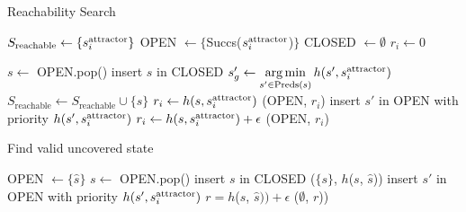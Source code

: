 \documentclass[a4paper,10pt]{article}
\begin{document}
\begin{algorithm}[t]
\caption{Reachability Search}\label{alg:2}

\begin{algorithmic}[1]
\State $S_{\text{reachable}} \leftarrow \{s^{\text{attractor}}_i\}$  \label{alg:2:reachable}
\State OPEN $\leftarrow \{$Succs($s^{\text{attractor}}_i$)$\}$   \label{alg:2:OPEN}
\State CLOSED $\leftarrow \emptyset$
\State $r_i \leftarrow 0$

    \State $s \leftarrow$ OPEN.pop()
    \State insert $s$ in CLOSED
    \State $s'_g \leftarrow \operatorname*{arg\,min}\limits_{s' \in \text{Preds}(s)} h(s', s^{\text{attractor}}_i)$ 
  \label{alg:2:greedy} 
      \label{alg:2:crit}
        \State $S_{\text{reachable}} \leftarrow S_{\text{reachable}} \cup \{s\}$   \label{alg:2:set}
     \label{alg:2:terminate}
        \State $r_i \leftarrow h(s, s^{\text{attractor}}_i)$ \label{alg:2:rad}
        \State \Return (OPEN, $r_i$)
    \EndIf
     \label{alg:2:prun}
            \State insert $s'$ in OPEN with priority $h(s', s^{\text{attractor}}_i)$
        \EndIf
    \EndFor
\EndWhile
\State $r_i \leftarrow h(s, s^{\text{attractor}}_i) + \epsilon$    
\State \Return (OPEN, $r_i$)

\EndProcedure
\end{algorithmic}
\end{algorithm}

\begin{algorithm}[t]
\caption{Find valid uncovered state}\label{alg:3b}

\begin{algorithmic}[1]
\State OPEN $\leftarrow \{\hat{s}\}$
  \State $s \leftarrow$ OPEN.pop()
  \State insert $s$ in CLOSED
    \State \Return ($\{s\}$, $h$($s$, $\hat{s}$))
  \EndIf
        \State insert $s'$ in OPEN with priority $h(s', s^{\text{attractor}}_i)$
    \EndIf
  \EndFor
\EndWhile
\State $r = h$($s$, $\hat{s})) + \epsilon$    
\State \Return ($\emptyset$, $r$))
\EndProcedure
\end{algorithmic}
\end{algorithm}
\end{document}

